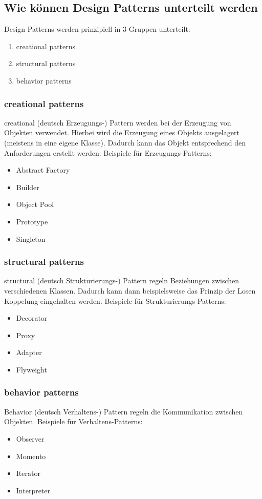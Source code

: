 \subsection{Wie können Design Patterns unterteilt werden}
Design Patterns werden prinzipiell in 3 Gruppen unterteilt:
\begin{enumerate}
	\item creational patterns
	\item structural patterns
	\item behavior patterns
\end{enumerate} 
\subsubsection{creational patterns}
creational (deutsch Erzeugungs-) Pattern werden bei der Erzeugung von Objekten verwendet. Hierbei wird die Erzeugung eines Objekts ausgelagert (meistens in eine eigene Klasse). Dadurch kann das Objekt entsprechend den Anforderungen erstellt werden.
Beispiele für Erzeugungs-Patterns:
\begin{itemize}
	\item Abstract Factory
	\item Builder
	\item Object Pool
	\item Prototype
	\item Singleton
\end{itemize}
\subsubsection{structural patterns}
structural (deutsch Strukturierungs-) Pattern regeln Beziehungen zwischen verschiedenen Klassen. Dadurch kann dann beispielsweise das Prinzip der Losen Koppelung eingehalten werden.
Beispiele für Strukturierungs-Patterns:
\begin{itemize}
	\item Decorator
	\item Proxy
	\item Adapter
	\item Flyweight
\end{itemize}
\subsubsection{behavior patterns}
Behavior (deutsch Verhaltens-) Pattern regeln die Kommunikation zwischen Objekten. 
  Beispiele für Verhaltens-Patterns:
  \begin{itemize}
  	\item Observer
  	\item Momento
  	\item Iterator
  	\item Interpreter
  \end{itemize}
